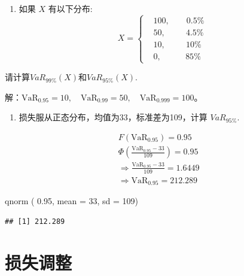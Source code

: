 \documentclass[
]{book}
\newenvironment{Shaded}{\begin{snugshade}}{\end{snugshade}}
\newcommand{\AttributeTok}[1]{\textcolor[rgb]{0.77,0.63,0.00}{#1}}
\newcommand{\DecValTok}[1]{\textcolor[rgb]{0.00,0.00,0.81}{#1}}
\newcommand{\FloatTok}[1]{\textcolor[rgb]{0.00,0.00,0.81}{#1}}
\newcommand{\FunctionTok}[1]{\textcolor[rgb]{0.00,0.00,0.00}{#1}}
\newcommand{\NormalTok}[1]{#1}
\providecommand{\tightlist}{%
  \setlength{\itemsep}{0pt}\setlength{\parskip}{0pt}}
\begin{document}
\begin{enumerate}
\def\labelenumi{\arabic{enumi}.}
\tightlist
\item
  如果 \(X\) 有以下分布: \[
  X=\begin{cases}
  & 100, \quad \quad  0.5\% \\
  & 50, \quad \quad  \ \  4.5\% \\
  & 10, \quad \quad  \ \ 10\% \\
  & 0, \quad \quad \ \ \ \ 85\%
  \end{cases}
  \]
\end{enumerate}

请计算\(VaR_{99\%}(X)\)和\(VaR_{95\%}(X)\).

解：\(\text{Va}{{\text{R}}_{0.95}}=10,\quad \text{Va}{{\text{R}}_{0.99}}=50, \quad \text{Va}{{\text{R}}_{0.999}}=100\)。

\begin{enumerate}
\def\labelenumi{\arabic{enumi}.}
\setcounter{enumi}{1}
\tightlist
\item
  损失服从正态分布，均值为33，标准差为109，计算 \(VaR_{95\%}\).
\end{enumerate}

\[
\begin{align*}
  & F(\text{Va}{{\text{R}}_{0.95}})=0.95 \\ 
 & \Phi \left( \frac{\text{Va}{{\text{R}}_{0.95}}-33}{109} \right)=0.95 \\ 
 & \Rightarrow \frac{\text{Va}{{\text{R}}_{0.95}}-33}{109}=1.6449 \\ 
 & \Rightarrow \text{Va}{{\text{R}}_{0.95}}=212.289
\end{align*}
\]

\begin{Shaded}
\begin{Highlighting}[]
\FunctionTok{qnorm}\NormalTok{ ( }\FloatTok{0.95}\NormalTok{, }\AttributeTok{mean =} \DecValTok{33}\NormalTok{, }\AttributeTok{sd =} \DecValTok{109}\NormalTok{)}
\end{Highlighting}
\end{Shaded}

\begin{verbatim}
## [1] 212.289
\end{verbatim}

\hypertarget{lossmodif}{%
\chapter{损失调整}\label{lossmodif}}
\end{document}
